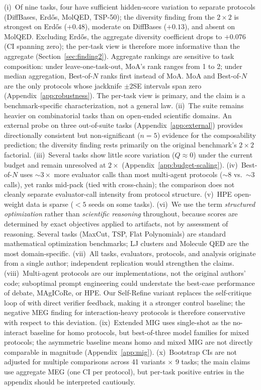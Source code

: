 \documentclass{article}
\begin{document}
(i)~Of nine tasks, four have sufficient hidden-score variation to separate protocols (DiffBases, Erd\H{o}s, MolQED, TSP-50); the diversity finding from the $2{\times}2$ is strongest on Erd\H{o}s ($+0.48$), moderate on DiffBases ($+0.13$), and absent on MolQED. Excluding Erd\H{o}s, the aggregate diversity coefficient drops to $+0.076$ (CI spanning zero); the per-task view is therefore more informative than the aggregate (Section~\ref{sec:finding2}). Aggregate rankings are sensitive to task composition: under leave-one-task-out, MoA's rank ranges from 1 to 2; under median aggregation, Best-of-$N$ ranks first instead of MoA. MoA and Best-of-$N$ are the only protocols whose jackknife $\pm2$SE intervals span zero (Appendix~\ref{app:robustness}). The per-task view is primary, and the claim is a benchmark-specific characterization, not a general law. (ii)~The suite remains heavier on combinatorial tasks than on open-ended scientific domains. An external probe on three out-of-suite tasks (Appendix~\ref{app:external}) provides directionally consistent but non-significant ($n{=}5$) evidence for the composability prediction; the diversity finding rests primarily on the original benchmark's $2{\times}2$ factorial. (iii)~Several tasks show little score variation ($Q \approx 0$) under the current budget and remain unresolved at $2{\times}$ (Appendix~\ref{app:budget-scaling}). (iv)~Best-of-$N$ uses ${\sim}3{\times}$ more evaluator calls than most multi-agent protocols (${\sim}8$ vs.\ ${\sim}3$ calls), yet ranks mid-pack (tied with cross-chain); the comparison does not cleanly separate evaluator-call intensity from protocol structure. (v)~HPE open-weight data is sparse ($<5$ seeds on some tasks). (vi)~We use the term \emph{structured optimization} rather than \emph{scientific reasoning} throughout, because scores are determined by exact objectives applied to artifacts, not by assessment of reasoning. Several tasks (MaxCut, TSP, Flat Polynomials) are standard mathematical optimization benchmarks; LJ clusters and Molecule QED are the most domain-specific. (vii)~All tasks, evaluators, protocols, and analysis originate from a single author; independent replication would strengthen the claims. (viii)~Multi-agent protocols are our implementations, not the original authors' code; suboptimal prompt engineering could understate the best-case performance of debate, MAgICoRe, or HPE. Our Self-Refine variant replaces the self-critique loop of \citet{madaan2023selfrefine} with direct verifier feedback, making it a stronger control baseline; the negative MEG finding for interaction-heavy protocols is therefore conservative with respect to this deviation. (ix)~Extended MIG uses single-shot as the no-interact baseline for homo protocols, but best-of-three model families for mixed protocols; the asymmetric baseline means homo and mixed MIG are not directly comparable in magnitude (Appendix~\ref{app:mig}). (x)~Bootstrap CIs are not adjusted for multiple comparisons across 41 variants $\times$ 9 tasks; the main claims use aggregate MEG (one CI per protocol), but per-task positive entries in the appendix should be interpreted cautiously.
\end{document}
